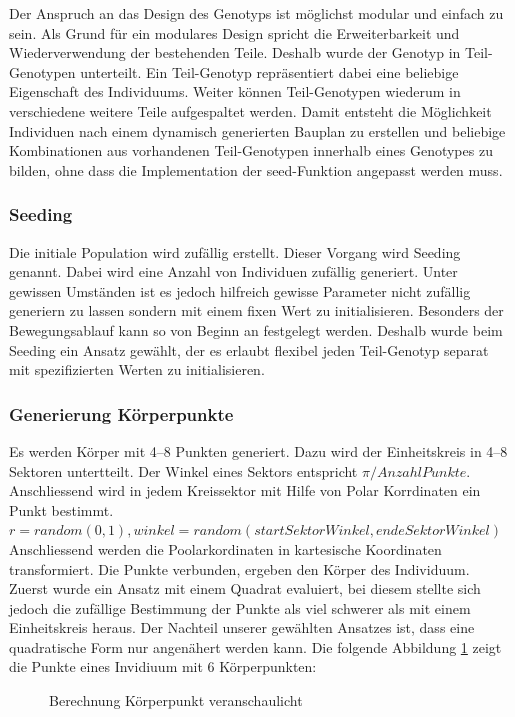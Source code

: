         Der Anspruch an das Design des Genotyps ist möglichst modular und einfach zu sein.
        Als Grund für ein modulares Design spricht die Erweiterbarkeit und Wiederverwendung der bestehenden Teile.
        Deshalb wurde der Genotyp in Teil-Genotypen unterteilt.
        Ein Teil-Genotyp repräsentiert dabei eine beliebige Eigenschaft des Individuums.
        Weiter können Teil-Genotypen wiederum in verschiedene weitere Teile aufgespaltet werden.
        Damit entsteht die Möglichkeit Individuen nach einem dynamisch generierten Bauplan zu erstellen
        und beliebige Kombinationen aus vorhandenen Teil-Genotypen innerhalb eines Genotypes zu bilden,
        ohne dass die Implementation der seed-Funktion angepasst werden muss.

        \subsubsection{Seeding\label{subsub:GenotypeSeeding}}

          Die initiale Population wird zufällig erstellt. Dieser Vorgang wird Seeding genannt.
          Dabei wird eine Anzahl von Individuen zufällig generiert.
          Unter gewissen Umständen ist es jedoch hilfreich gewisse Parameter nicht zufällig generiern zu lassen
          sondern mit einem fixen Wert zu initialisieren.
          Besonders der Bewegungsablauf kann so von Beginn an festgelegt werden.
          Deshalb wurde beim Seeding ein Ansatz gewählt, der es erlaubt flexibel jeden Teil-Genotyp separat mit
          spezifizierten Werten zu initialisieren.

      \subsubsection{Generierung Körperpunkte\label{subsub:GenotypGenerierungKörperpunkte}}
        Es werden Körper mit 4--8 Punkten generiert. Dazu wird der Einheitskreis in 4--8 Sektoren untertteilt.
        Der Winkel eines Sektors entspricht \(\pi / Anzahl Punkte\). \\
        Anschliessend wird in jedem Kreissektor mit Hilfe von Polar Korrdinaten ein Punkt bestimmt. \\
        \( r = random (0, 1), winkel = random(startSektorWinkel, endeSektorWinkel ) \)
        Anschliessend werden die Poolarkordinaten in kartesische Koordinaten transformiert.
        Die Punkte verbunden, ergeben den Körper des Individuum. \\
        Zuerst wurde ein Ansatz mit einem Quadrat evaluiert, bei diesem stellte sich jedoch die zufällige Bestimmung
        der Punkte als viel schwerer als mit einem Einheitskreis heraus. Der Nachteil unserer gewählten
        Ansatzes ist, dass eine quadratische Form nur angenähert werden kann.
        Die folgende Abbildung \ref{fig:kp} zeigt die Punkte eines Invidiuum mit 6 Körperpunkten: \\
        \begin{figure}[H]
          
          \caption{Berechnung Körperpunkt veranschaulicht}
          \label{fig:kp}
        \end{figure}

